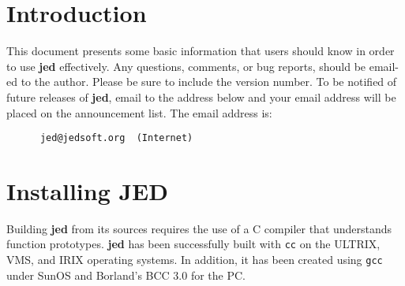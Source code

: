 %
%

\setlength{\oddsidemargin}{0mm}
\setlength{\evensidemargin}{0mm}
\setlength{\textwidth}{160mm}
\setlength{\topmargin}{-10mm}
\setlength{\textheight}{210mm}
\setlength{\parindent}{0mm}
\setlength{\parskip}{5mm}

\def\mytitle{The JED Editor}

\newlength{\pagewidth}
\setlength{\pagewidth}{\textwidth}

\makeatletter
\def\ps@headings{\def\@oddfoot{}%
\def\@oddhead{\makebox[\textwidth][l]{\underline{\hbox to \pagewidth{\bf
\mytitle\hfill\thepage}}}}%
\def\@evenfoot{}%
\def\@evenhead{\makebox[\textwidth][l]{\underline{\hbox to \pagewidth{\bf
\mytitle\hfill\thepage}}}}}%
\pagestyle{headings}

\newcommand{\slang}{{\bf S-Lang}}
\newcommand{\jed}{{\bf jed}}
\newcommand{\exmp}[1]{{\tt #1}}
\newcommand{\var}[1]{{\tt #1}}
\newcommand{\key}[1]{{\sc #1}}


\tableofcontents
\pagebreak

\section{Introduction}

 This document presents some basic information that users should know in
 order to use \jed{} effectively.  Any questions, comments, or bug reports,
 should be email-ed to the author. Please be sure to include the version
 number.  To be notified of future releases of \jed{}, email to the address
 below and your email address will be placed on the announcement list. The
 email address is:
\begin{verbatim}
      jed@jedsoft.org  (Internet)
\end{verbatim}

\section{Installing JED}

 Building \jed{} from its sources requires the use of a C compiler that
 understands function prototypes.  \jed{} has been successfully built with
 \verb|cc| on the ULTRIX, VMS, and IRIX operating systems.  In addition, it
 has been created using \verb|gcc| under SunOS and Borland's BCC 3.0 for the
 PC.

